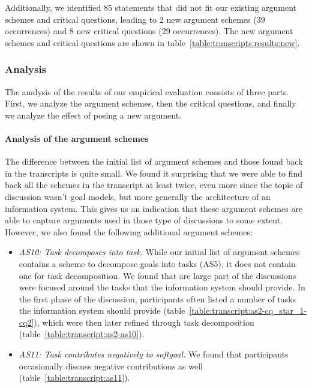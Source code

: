 \documentclass[11.5pt,two column]{llncs}
\begin{document}
Additionally, we identified 85 statements that did not fit our existing argument schemes and critical questions, leading to 2 new argument schemes (39 occurrences) and 8 new critical questions (29 occurrences). The new argument schemes and critical questions are shown in table~\ref{table:transcripts:results:new}. 

\subsubsection{Analysis}

The analysis of the results of our empirical evaluation consists of three parts. First, we analyze the argument schemes, then the critical questions, and finally we analyze the effect of posing a new argument.

\paragraph{Analysis of the argument schemes}
The difference between the initial list of argument schemes and those found back in the transcripts is quite small. We found it surprising that we were able to find back all the schemes in the transcript at least twice, even more since the topic of discussion wasn't goal models, but more generally the architecture of an information system. This gives us an indication that these argument schemes are able to capture arguments used in those type of discussions to some extent. However, we also found the following additional argument schemes:
\begin{itemize}
\item
\emph{AS10: Task decomposes into task.} While our initial list of argument schemes contains a scheme to decompose goals into tasks (AS5), it does not contain one for task decomposition. We found that are large part of the discussions were focused around the tasks that the information system should provide. In the first phase of the discussion, participants often listed a number of tasks the information system should provide (table~\ref{table:transcript:as2-cq_star_1-cq2}), which were then later refined through task decomposition (table~\ref{table:transcript:as2-as10}).
\item 
\emph{AS11: Task contributes negatively to softgoal.}  We found that participants occasionally discuss negative contributions as well (table~\ref{table:transcript:as11}).
\end{itemize}
\end{document}
